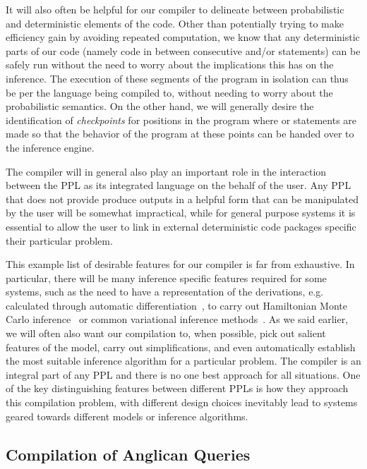 It will also often be helpful for our compiler to delineate between probabilistic and deterministic
elements of the code.  Other than potentially trying to make efficiency gain by avoiding
repeated computation, we know that any deterministic parts of our code (namely code in between
consecutive \sample and/or \observe statements) can be safely run without the need
to worry about the implications this has on the inference.  The execution of these segments of
the program in isolation can thus be per the language being compiled to, without needing to
worry about the probabilistic semantics.  On the other hand, we will generally desire the identification
of \emph{checkpoints} for positions in the program where \sample or \observe statements are
made so that the behavior of the program at these points can be handed over to the inference
engine.

The compiler will in general also play an important role in the interaction between the PPL
as its integrated language on the behalf of the user.  Any PPL that does not provide produce
outputs in a helpful form that can be manipulated by the user will be somewhat impractical,
while for general purpose systems it is essential to allow the user to link in external 
deterministic code packages specific their particular problem.

This example list of desirable features for our compiler is far from exhaustive.
In particular, there will be many inference specific features required for some
systems, such as the need to have a representation of the derivations, e.g. calculated
through automatic differentiation~\cite{baydin2015automatic}, to carry out 
Hamiltonian Monte Carlo inference~\cite{carpenter2015stan}
or common variational inference methods~\citep{kucukelbir2015automatic}.  As we
said earlier, we will often also want our compilation to, when possible,
pick out salient features of the model, carry out simplifications, and even automatically 
establish the most suitable inference algorithm for a particular problem.  The compiler
is an integral part of any PPL and there is no one best approach for all situations. 
One of the key distinguishing features between different PPLs is how they approach
this compilation problem, with different design choices inevitably lead to systems
geared towards different models or inference algorithms. 

\subsection{Compilation of Anglican Queries}
\label{sec:proginf:comp:ang}

